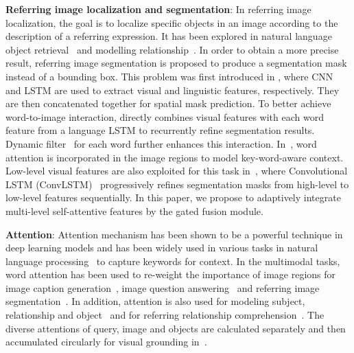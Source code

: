 \documentclass[10pt,twocolumn,letterpaper]{article}
\begin{document}
\noindent\textbf{Referring image localization and segmentation}: In referring image localization, the goal is to localize specific objects in an image according to the description of a referring expression. It has been explored in natural language object retrieval~\cite{hu2016natural} and modelling relationship~\cite{hu2017modeling,yu2018mattnet}. In order to obtain a more precise result,  referring image segmentation is proposed to produce a segmentation mask instead of a bounding box. This problem was first introduced in \cite{hu2016segmentation}, where CNN and LSTM are used to extract visual and linguistic features, respectively. They are then concatenated together for spatial mask prediction. To better achieve word-to-image interaction, \cite{liu2017recurrent} directly combines visual features with each word feature from a language LSTM to recurrently refine segmentation results. Dynamic filter~\cite{margffoy2018dynamic} for each word further enhances this interaction. In~\cite{shi2018key}, word attention is incorporated in the image regions to model key-word-aware context. Low-level visual features are also exploited for this task in~\cite{li2018referring}, where Convolutional LSTM (ConvLSTM)~\cite{xingjian2015convolutional} progressively refines segmentation masks from high-level to low-level features sequentially. In this paper, we propose to adaptively integrate multi-level self-attentive features by the gated fusion module. 


\noindent\textbf{Attention}: Attention mechanism has been shown to be a powerful technique in deep learning models and has been widely used in various tasks in natural language processing~\cite{bahdanau2014neural,vaswani2017attention} to capture keywords for context. In the multimodal tasks, word attention has been used to re-weight the importance of image regions for image caption generation~\cite{xu2015show}, image question answering~\cite{yang2016stacked} and referring image segmentation~\cite{shi2018key}. In addition, attention is also used for modeling subject, relationship and object~\cite{hu2017modeling} and for referring relationship comprehension~\cite{yu2018mattnet}. The diverse attentions of query, image and objects are calculated separately and then accumulated circularly for visual grounding in~\cite{deng2018visual}.
\end{document}
